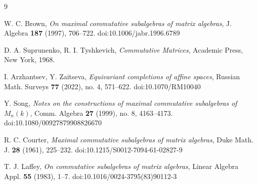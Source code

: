 \documentclass[11pt]{article}
\theoremstyle{plain}
\theoremstyle{remark}
\begin{document}
\begin{thebibliography}{9}
	
W. C. Brown,
\emph{On maximal commutative subalgebras of matrix algebras},
J. Algebra \textbf{187} (1997), 706--722.
doi:10.1006/jabr.1996.6789

D. A. Suprunenko, R. I. Tyshkevich,
\emph{Commutative Matrices},
Academic Press, New York, 1968.

I. Arzhantsev, Y. Zaitseva,
\emph{Equivariant completions of affine spaces},
Russian Math. Surveys \textbf{77} (2022), no. 4, 571--622.
doi:10.1070/RM10040

Y. Song,
\emph{Notes on the constructions of maximal commutative subalgebras of $M_n(k)$},
Comm. Algebra \textbf{27} (1999), no. 8, 4163--4173.
doi:10.1080/00927879908826670

R. C. Courter,
\emph{Maximal commutative subalgebras of matrix algebras},
Duke Math. J. \textbf{28} (1961), 225--232.
doi:10.1215/S0012-7094-61-02827-9

T. J. Laffey,
\emph{On commutative subalgebras of matrix algebras},
Linear Algebra Appl. \textbf{55} (1983), 1--7.
doi:10.1016/0024-3795(83)90112-3
	
\end{thebibliography}
\end{document}

